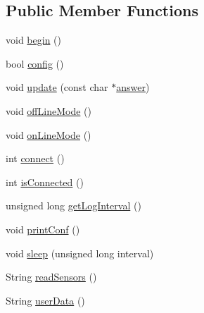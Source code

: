 \subsection*{Public Member Functions}
\begin{DoxyCompactItemize}
\item 
void \hyperlink{classCoolBoard_acba7c5aef7268b2c0044bdb54d3b9d76}{begin} ()
\item 
bool \hyperlink{classCoolBoard_a583a874c09c07e70a6eb9229fc4beddb}{config} ()
\item 
void \hyperlink{classCoolBoard_a8612756d3f73198cdde857a66f0fe690}{update} (const char $\ast$\hyperlink{classCoolBoard_a7b835fafd449e5282f7f91d787a2dc15}{answer})
\item 
void \hyperlink{classCoolBoard_ae6b5e1274d760462290192acea4adca8}{off\+Line\+Mode} ()
\item 
void \hyperlink{classCoolBoard_aa0bbc4bc605e35618d18e68795c61363}{on\+Line\+Mode} ()
\item 
int \hyperlink{classCoolBoard_a519de78b807f8ec6463ff484eb925918}{connect} ()
\item 
int \hyperlink{classCoolBoard_ad7442cf4b62c7b0d5bd62a0f75ffc065}{is\+Connected} ()
\item 
unsigned long \hyperlink{classCoolBoard_a7508e029f2ee17bb747ffab599285e0d}{get\+Log\+Interval} ()
\item 
void \hyperlink{classCoolBoard_a486507b8f0981d3cc671ed31c2145755}{print\+Conf} ()
\item 
void \hyperlink{classCoolBoard_a069952cdcb2e7f68518aa429eceadb6e}{sleep} (unsigned long interval)
\item 
String \hyperlink{classCoolBoard_ad03abdce2e65f520bbf2cff0f2d083cf}{read\+Sensors} ()
\item 
String \hyperlink{classCoolBoard_ae7358fb6e623cfc81b775f5f1734909b}{user\+Data} ()
\end{DoxyCompactItemize}
